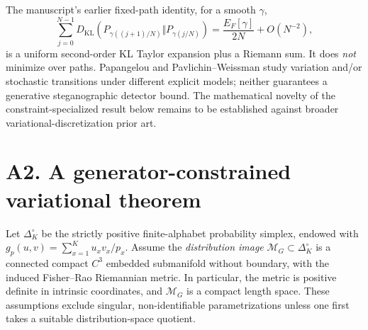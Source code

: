\documentclass[10pt,a4paper]{article}
\newcommand{\KL}{D_{\mathrm{KL}}}
\newcommand{\MM}{\mathcal M_G}
\begin{document}
The manuscript's earlier fixed-path identity, for a smooth $\gamma$,
\begin{equation}\label{eq:fixed}
\sum_{j=0}^{N-1}\KL(P_{\gamma((j+1)/N)}\Vert P_{\gamma(j/N)})
=\frac{E_F[\gamma]}{2N}+O(N^{-2}),
\end{equation}
is a uniform second-order KL Taylor expansion plus a Riemann sum. It does \emph{not} minimize over paths. Papangelou and Pavlichin--Weissman study variation and/or stochastic transitions under different explicit models; neither guarantees a generative steganographic detector bound. The mathematical novelty of the constraint-specialized result below remains to be established against broader variational-discretization prior art.

\section{A2. A generator-constrained variational theorem}
Let $\Delta_{K}^{\circ}$ be the strictly positive finite-alphabet probability simplex, endowed with $g_p(u,v)=\sum_{x=1}^K u_xv_x/p_x$. Assume the \emph{distribution image} $\MM\subset\Delta_K^{\circ}$ is a connected compact $C^3$ embedded submanifold without boundary, with the induced Fisher--Rao Riemannian metric. In particular, the metric is positive definite in intrinsic coordinates, and $\MM$ is a compact length space. These assumptions exclude singular, non-identifiable parametrizations unless one first takes a suitable distribution-space quotient.
\end{document}
